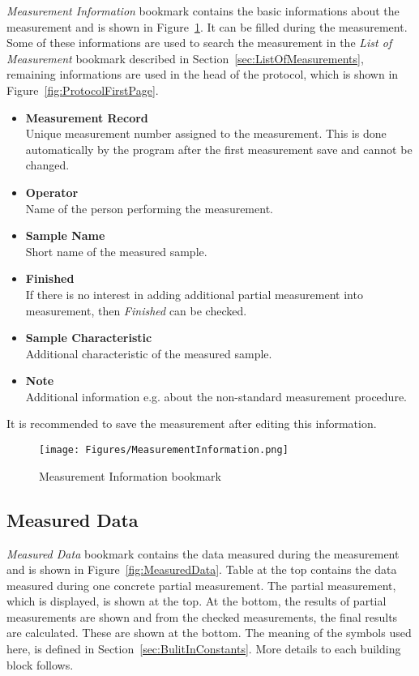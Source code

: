 \documentclass[a4paper,11pt,twoside]{book}
\theoremstyle{named}
\begin{document}
\textit{Measurement Information} bookmark contains the basic informations about the
measurement and is shown in Figure~\ref{fig:MeasurementInformation}. It can be
filled during the measurement. Some of these informations are used to search the
measurement in the \textit{List of Measurement} bookmark described in
Section~\ref{sec:ListOfMeasurements}, remaining informations are used in the
head of the protocol, which is shown in Figure~\ref{fig:ProtocolFirstPage}. 

\begin{itemize}
  \item \textbf{Measurement Record} \\
    Unique measurement number assigned to the measurement. This is done
    automatically by the program after the first measurement save and cannot be
    changed.
  \item \textbf{Operator} \\
    Name of the person performing the measurement. 
  \item \textbf{Sample Name} \\
    Short name of the measured sample.
  \item \textbf{Finished} \\
    If there is no interest in adding additional partial measurement into
    measurement, then \textit{Finished} can be checked.
  \item \textbf{Sample Characteristic} \\
    Additional characteristic of the measured sample.
  \item \textbf{Note} \\
    Additional information e.g. about the non-standard measurement procedure.
\end{itemize}

It is recommended to save the measurement after editing this information. 

\begin{figure}[t]
  \centering
  \texttt{[image: Figures/MeasurementInformation.png]}
  \caption{Measurement Information bookmark}
  \label{fig:MeasurementInformation}
\end{figure}

\subsection{Measured Data}
\label{sec:MeasuredData}

\textit{Measured Data} bookmark contains the data measured during the measurement and is
shown in Figure~\ref{fig:MeasuredData}. Table at the top contains the data
measured during one concrete partial measurement. The partial
measurement, which is displayed, is shown at the top. At the bottom, the results
of partial measurements are shown and from the checked measurements, the
final results are calculated. These are shown at the bottom. The meaning of the symbols
used here, is defined in Section~\ref{sec:BulitInConstants}. More details to each building
block follows.
\end{document}
